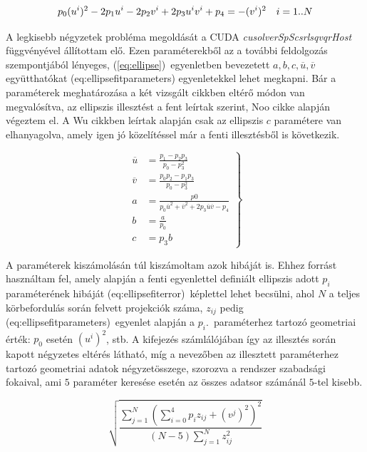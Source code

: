 \documentclass[a4paper,12pt]{article}
\begin{document}
\begin{equation}
\label{eq:ellipsefit}
p_0 (u^i)^2 - 2p_1u^i - 2p_2v^i + 2p_3u^iv^i + p_4 = -(v^i)^2 \hskip10pt i=1..N
\end{equation}

A legkisebb négyzetek probléma megoldását a CUDA \emph{cusolverSpScsrlsqvqrHost} függvényével állítottam elő. Ezen paraméterekből az  a további feldolgozás szempontjából lényeges, (\ref{eq:ellipse})~egyenletben bevezetett $a,b,c,\overline{u},\overline{v}$ együtthatókat \aref({eq:ellipsefitparameters}) egyenletekkel lehet megkapni. Bár a paraméterek meghatározása a két vizsgált cikkben eltérő módon van megvalósítva, az ellipszis illesztést a fent leírtak szerint, Noo\cite{noo} cikke alapján végeztem el. A Wu\cite{wu} cikkben leírtak alapján csak az ellipszis $c$ paramétere van elhanyagolva, amely igen jó közelítéssel már a fenti illesztésből is következik. 


\begin{equation}
\label{eq:ellipsefitparameters}
\left .
\begin{split}
\overline{u} &= \frac{p_1-p_2p_3}{p_0-p_3^2}\\
\overline{v} &= \frac{p_0p_2-p_1p_3}{p_0-p_3^2}\\
a &= \frac{p0}{p_0\overline{u}^2 + \overline{v}^2 + 2p_3\overline{u} \overline{v} - p_4} \\
b &= \frac{a}{p_0}\\
c &=p_3b
\end{split}
\right  \}
\end{equation}


A paraméterek kiszámolásán túl kiszámoltam azok hibáját is. Ehhez  forrást használtam fel, amely alapján a fenti egyenlettel definiált ellipszis adott $p_i$ paraméterének hibáját \aref({eq:ellipsefiterror})~képlettel lehet becsülni, ahol $N$ a teljes körbefordulás során felvett projekciók száma, $z_{ij}$ pedig \aref({eq:ellipsefitparameters})~egyenlet alapján
 a $p_i$.\ paraméterhez tartozó geometriai érték: $p_0$ esetén $\left(u^i\right)^2$, stb. A kifejezés számlálójában így az illesztés során kapott négyzetes eltérés látható, míg a nevezőben az illesztett paraméterhez tartozó geometriai adatok négyzetösszege, szorozva a rendszer szabadsági fokaival, ami $5$ paraméter keresése esetén az összes adatsor számánál $5$-tel kisebb.


\begin{equation}
\label{eq:ellipsefiterror}
\sqrt{\frac{\sum_{j=1}^N \left ( \sum_{i=0}^4 p_i z_{ij} + \left (v^j \right)^2 \right)^2 }{(N-5) \sum_{j=1}^N z_{ij} ^2 }}
\end{equation}
\end{document}
